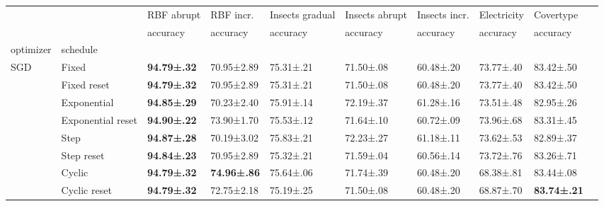 \begin{tabular}{llllllllll}
    \toprule
                             &                   & RBF abrupt          & RBF incr.           & Insects gradual     & Insects abrupt      & Insects incr.       & Electricity         & Covertype           \\
                             &                   & accuracy            & accuracy            & accuracy            & accuracy            & accuracy            & accuracy            & accuracy            \\
    optimizer                & schedule          &                     &                     &                     &                     &                     &                     &                     \\
    \midrule
    \multirow[c]{8}{*}{SGD}  & Fixed             & \bfseries 94.79±.32 & 70.95±2.89          & 75.31±.21           & 71.50±.08           & 60.48±.20           & 73.77±.40           & 83.42±.50           \\
                             & Fixed reset       & \bfseries 94.79±.32 & 70.95±2.89          & 75.31±.21           & 71.50±.08           & 60.48±.20           & 73.77±.40           & 83.42±.50           \\
                             & Exponential       & \bfseries 94.85±.29 & 70.23±2.40          & 75.91±.14           & 72.19±.37           & 61.28±.16           & 73.51±.48           & 82.95±.26           \\
                             & Exponential reset & \bfseries 94.90±.22 & 73.90±1.70          & 75.53±.12           & 71.64±.10           & 60.72±.09           & 73.96±.68           & 83.31±.45           \\
                             & Step              & \bfseries 94.87±.28 & 70.19±3.02          & 75.83±.21           & 72.23±.27           & 61.18±.11           & 73.62±.53           & 82.89±.37           \\
                             & Step reset        & \bfseries 94.84±.23 & 70.95±2.89          & 75.32±.21           & 71.59±.04           & 60.56±.14           & 73.72±.76           & 83.26±.71           \\
                             & Cyclic            & \bfseries 94.79±.32 & \bfseries 74.96±.86 & 75.64±.06           & 71.74±.39           & 60.48±.20           & 68.38±.81           & 83.44±.08           \\
                             & Cyclic reset      & \bfseries 94.79±.32 & 72.75±2.18          & 75.19±.25           & 71.50±.08           & 60.48±.20           & 68.87±.70           & \bfseries 83.74±.21 \\

\end{tabular}
